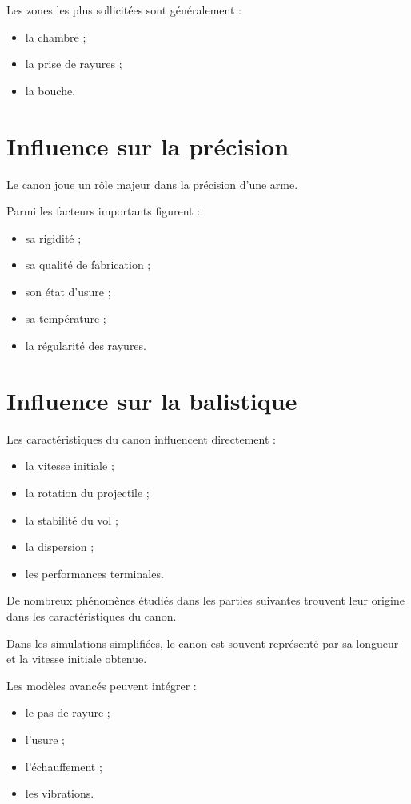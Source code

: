 Les zones les plus sollicitées sont généralement :

\begin{itemize}
    \item la chambre ;
    \item la prise de rayures ;
    \item la bouche.
\end{itemize}

\section{Influence sur la précision}

Le canon joue un rôle majeur dans la précision d'une arme.

Parmi les facteurs importants figurent :

\begin{itemize}
    \item sa rigidité ;
    \item sa qualité de fabrication ;
    \item son état d'usure ;
    \item sa température ;
    \item la régularité des rayures.
\end{itemize}

\section{Influence sur la balistique}

Les caractéristiques du canon influencent directement :

\begin{itemize}
    \item la vitesse initiale ;
    \item la rotation du projectile ;
    \item la stabilité du vol ;
    \item la dispersion ;
    \item les performances terminales.
\end{itemize}

De nombreux phénomènes étudiés dans les parties suivantes trouvent leur
origine dans les caractéristiques du canon.

\begin{simulation}

Dans les simulations simplifiées, le canon est souvent représenté par sa
longueur et la vitesse initiale obtenue.

Les modèles avancés peuvent intégrer :

\begin{itemize}
    \item le pas de rayure ;
    \item l'usure ;
    \item l'échauffement ;
    \item les vibrations.
\end{itemize}

\end{simulation}

